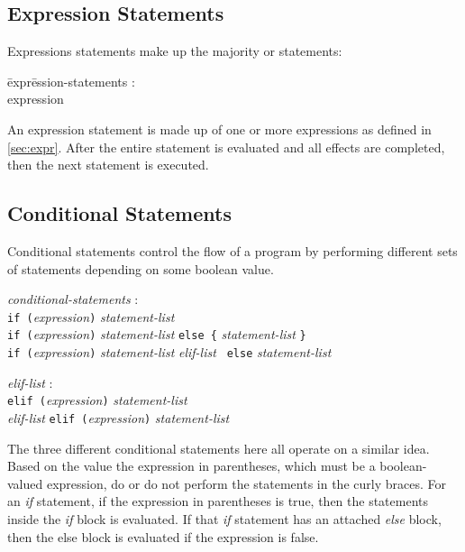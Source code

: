 \documentclass{article}
\begin{document}
\subsection{Expression Statements}
Expressions statements make up the majority or statements:

\begin{itshape}
\begin{tabbing}
	\= expr\=ession-statements : \\
		\>\> expression
\end{tabbing}
\end{itshape}

An expression statement is made up of one or more expressions as defined in \ref{sec:expr}. After the entire statement is evaluated and all effects are completed, then the next statement is executed.

\subsection{Conditional Statements}
Conditional statements control the flow of a program by performing different sets of statements depending on some boolean value. 

\begin{tabbing}
	\= \emph{cond}\=\emph{itional-statements} : \\
		\> \> \texttt{if (}\emph{expression}\texttt{)} \emph{statement-list}\\
		\>\>  \texttt{if (}\emph{expression}\texttt{)} \emph{statement-list} \texttt{} \texttt{else}\texttt{ \{} \emph{statement-list} \texttt{\}} \\
		\>\>  \texttt{if (}\emph{expression}\texttt{)} \emph{statement-list} \texttt{} \emph{elif-list} \texttt{ else} \emph{statement-list} \\
\end{tabbing}
\begin{tabbing}
	\= \emph{eli}\=\emph{f-list} : \\
		\> \> \texttt{elif (}\emph{expression}\texttt{)} \emph{statement-list} \\
		\> \> \emph{elif-list} \texttt{elif (}\emph{expression}\texttt{)} \emph{statement-list}\\
\end{tabbing}



The three different conditional statements here all operate on a similar idea. Based on the value the expression in parentheses, which must be a boolean-valued expression, do or do not perform the statements in the curly braces. For an \emph{if} statement, if the expression in parentheses is true, then the statements inside the \emph{if} block is evaluated. If that \emph{if} statement has an attached \emph{else} block, then the else block is evaluated if the expression is false. 
\end{document}
